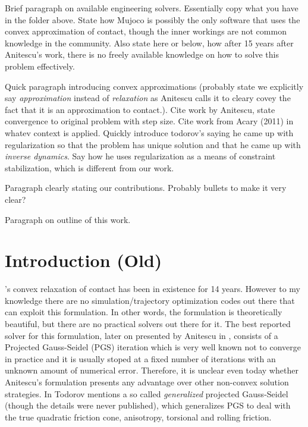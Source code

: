 Brief paragraph on available engineering solvers. Essentially copy what you have
in the folder above. State how Mujoco is possibly the only software that uses the convex approximation of contact, though the inner workings are not common knowledge in the community. Also state here or below, how after 15 years after Anitescu's work, there is no freely available knowledge on how to solve this problem effectively.

Quick paragraph introducing convex approximations (probably state we explicitly
say \emph{approximation} instead of \emph{relaxation} as Anitescu calls it to
cleary covey the fact that it is an approximation to contact.). Cite work by
Anitescu, state convergence to original problem with step size. Cite work from
Acary (2011) in whatev context is applied. Quickly introduce todorov's saying he
came up with regularization so that the problem has unique solution and that he
came up with \emph{inverse dynamics}. Say how he uses regularization as a means
of constraint stabilization, which is different from our work.


Paragraph clearly stating our contributions. Probably bullets to make it very
clear?

Paragraph on outline of this work.


\section{Introduction (Old)}

's convex relaxation of contact
\cite{bib:anitescu2006} has been in existence for 14 years. However to my
knowledge there are no simulation/trajectory optimization codes out there that
can exploit this formulation. In other words, the formulation is theoretically
beautiful, but there are no practical solvers out there for it. The best
reported solver for this formulation, later on presented by Anitescu in
\cite{bib:anitescu2010, bib:tasora2011}, consists of a Projected Gauss-Seidel
(PGS) iteration which is very well known not to converge in practice and it is
usually stoped at a fixed number of iterations with an unknown amount of
numerical error. Therefore, it is unclear even today whether Anitescu's
formulation presents any advantage over other non-convex solution strategies. In
\cite{bib:todorov2014} Todorov mentions a so called \textit{generalized}
projected Gauss-Seidel (though the details were never published), which
generalizes PGS to deal with the true quadratic friction cone, anisotropy,
torsional and rolling friction.

